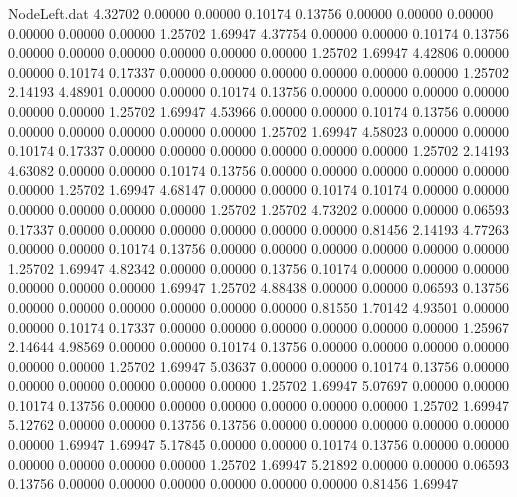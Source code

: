 \begin{filecontents}{NodeLeft.dat}
   4.32702    0.00000    0.00000     0.10174    0.13756    0.00000    0.00000    0.00000    0.00000    0.00000    0.00000    1.25702    1.69947
   4.37754    0.00000    0.00000     0.10174    0.13756    0.00000    0.00000    0.00000    0.00000    0.00000    0.00000    1.25702    1.69947
   4.42806    0.00000    0.00000     0.10174    0.17337    0.00000    0.00000    0.00000    0.00000    0.00000    0.00000    1.25702    2.14193
   4.48901    0.00000    0.00000     0.10174    0.13756    0.00000    0.00000    0.00000    0.00000    0.00000    0.00000    1.25702    1.69947
   4.53966    0.00000    0.00000     0.10174    0.13756    0.00000    0.00000    0.00000    0.00000    0.00000    0.00000    1.25702    1.69947
   4.58023    0.00000    0.00000     0.10174    0.17337    0.00000    0.00000    0.00000    0.00000    0.00000    0.00000    1.25702    2.14193
   4.63082    0.00000    0.00000     0.10174    0.13756    0.00000    0.00000    0.00000    0.00000    0.00000    0.00000    1.25702    1.69947
   4.68147    0.00000    0.00000     0.10174    0.10174    0.00000    0.00000    0.00000    0.00000    0.00000    0.00000    1.25702    1.25702
   4.73202    0.00000    0.00000     0.06593    0.17337    0.00000    0.00000    0.00000    0.00000    0.00000    0.00000    0.81456    2.14193
   4.77263    0.00000    0.00000     0.10174    0.13756    0.00000    0.00000    0.00000    0.00000    0.00000    0.00000    1.25702    1.69947
   4.82342    0.00000    0.00000     0.13756    0.10174    0.00000    0.00000    0.00000    0.00000    0.00000    0.00000    1.69947    1.25702
   4.88438    0.00000    0.00000     0.06593    0.13756    0.00000    0.00000    0.00000    0.00000    0.00000    0.00000    0.81550    1.70142
   4.93501    0.00000    0.00000     0.10174    0.17337    0.00000    0.00000    0.00000    0.00000    0.00000    0.00000    1.25967    2.14644
   4.98569    0.00000    0.00000     0.10174    0.13756    0.00000    0.00000    0.00000    0.00000    0.00000    0.00000    1.25702    1.69947
   5.03637    0.00000    0.00000     0.10174    0.13756    0.00000    0.00000    0.00000    0.00000    0.00000    0.00000    1.25702    1.69947
   5.07697    0.00000    0.00000     0.10174    0.13756    0.00000    0.00000    0.00000    0.00000    0.00000    0.00000    1.25702    1.69947
   5.12762    0.00000    0.00000     0.13756    0.13756    0.00000    0.00000    0.00000    0.00000    0.00000    0.00000    1.69947    1.69947
   5.17845    0.00000    0.00000     0.10174    0.13756    0.00000    0.00000    0.00000    0.00000    0.00000    0.00000    1.25702    1.69947
   5.21892    0.00000    0.00000     0.06593    0.13756    0.00000    0.00000    0.00000    0.00000    0.00000    0.00000    0.81456    1.69947

\end{filecontents}
